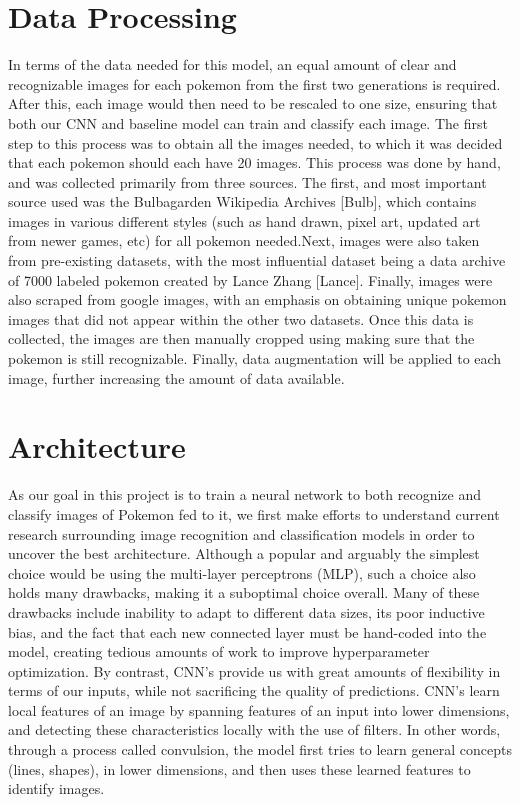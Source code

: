 \documentclass{article} %
\begin{document}
\section{Data Processing}

In terms of the data needed for this model, an equal amount of clear and recognizable images for each pokemon from the first two generations is required. After this, each image would then need to be rescaled to one size, ensuring that both our CNN and baseline model can train and classify each image. The first step to this process was to obtain all the images needed, to which it was decided that each pokemon should each have 20 images. This process was done by hand, and was collected primarily from three sources. The first, and most important source used was the Bulbagarden Wikipedia Archives [Bulb], which contains images in various different styles (such as hand drawn, pixel art, updated art from newer games, etc) for all pokemon needed.Next, images were also taken from pre-existing datasets, with the most influential dataset being a data archive of 7000 labeled pokemon created by Lance Zhang [Lance]. Finally, images were also scraped from google images, with an emphasis on obtaining unique pokemon images that did not appear within the other two datasets. Once this data is collected, the images are then manually cropped using making sure that the pokemon is still recognizable. Finally, data augmentation will be applied to each image, further increasing the amount of data available. 

\section {Architecture}

As our goal in this project is to train a neural network to both recognize and classify images of Pokemon fed to it, we first make efforts to understand current research surrounding image recognition and classification models in order to uncover the best architecture. Although a popular and arguably the simplest choice would be using the multi-layer perceptrons (MLP), such a choice also holds many drawbacks, making it a suboptimal choice overall. Many of these drawbacks include inability to adapt to different data sizes, its poor inductive bias, and the fact that each new connected layer must be hand-coded into the model, creating tedious amounts of work to improve hyperparameter optimization. By contrast, CNN's provide us with great amounts of flexibility in terms of our inputs, while not sacrificing the quality of predictions. CNN's learn local features of an image by spanning features of an input into lower dimensions, and detecting these characteristics locally with the use of filters. In other words, through a process called convulsion, the model first tries to learn general concepts (lines, shapes), in lower dimensions, and then uses these learned features to identify images. 
\end{document}
